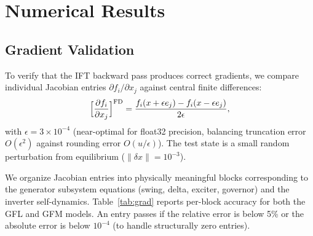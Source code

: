 \documentclass[11pt]{article}
\begin{document}
\section{Numerical Results}
\label{sec:results}

\subsection{Gradient Validation}
\label{sec:grad_valid}

To verify that the IFT backward pass produces correct gradients, we
compare individual Jacobian entries $\partial f_i / \partial x_j$
against central finite differences:
\begin{equation}
  \Bigl[\frac{\partial f_i}{\partial x_j}\Bigr]^{\mathrm{FD}}
    = \frac{f_i(x + \epsilon e_j) - f_i(x - \epsilon e_j)}
    {2\epsilon},
  \label{eq:fd}
\end{equation}
with $\epsilon = 3\times10^{-4}$ (near-optimal for float32 precision,
balancing truncation error $O(\epsilon^2)$ against rounding error
$O(u/\epsilon)$).  The test state is a small random perturbation
from equilibrium ($\|\delta x\| = 10^{-3}$).

We organize Jacobian entries into physically meaningful blocks
corresponding to the generator subsystem equations (swing, delta,
exciter, governor) and the inverter self-dynamics.  Table~\ref{tab:grad}
reports per-block accuracy for both the GFL and GFM models.  An entry
passes if the relative error is below 5\% or the absolute error is
below $10^{-4}$ (to handle structurally zero entries).
\end{document}
